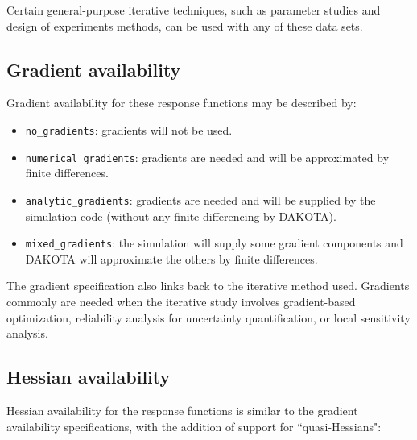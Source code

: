 Certain general-purpose iterative techniques, such as parameter
studies and design of experiments methods, can be used with any of
these data sets.

\subsection{Gradient availability}\label{responses:overview:gradient}

Gradient availability for these response functions may be described by:

\begin{itemize}

\item \texttt{no\_gradients}: gradients will not be used.

\item \texttt{numerical\_gradients}: gradients are needed and will
  be approximated by finite differences.

\item \texttt{analytic\_gradients}: gradients are needed and will be supplied
  by the simulation code (without any finite differencing by DAKOTA).

\item \texttt{mixed\_gradients}: the simulation will supply some gradient
  components and DAKOTA will approximate the others by finite
  differences.

\end{itemize}

The gradient specification also links back to the iterative method
used. Gradients commonly are needed when the iterative
study involves gradient-based optimization, reliability analysis for
uncertainty quantification, or local sensitivity analysis.

\subsection{Hessian availability}\label{responses:overview:hessian}

Hessian availability for the response functions is similar to the
gradient availability specifications, with the addition of support
for ``quasi-Hessians":

